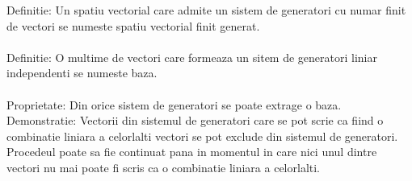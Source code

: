 \documentclass{article}
\begin{document}
        Definitie: Un spatiu vectorial care admite un sistem de generatori cu numar finit de vectori se numeste spatiu vectorial finit generat. \\ \\
        Definitie: O multime de vectori care formeaza un sitem de generatori liniar independenti se numeste baza. \\ \\
        Proprietate: Din orice sistem de generatori se poate extrage o baza.\\
        Demonstratie: Vectorii din sistemul de generatori care se pot scrie ca fiind o combinatie liniara a celorlalti vectori se pot exclude din sistemul de generatori. Procedeul poate sa fie continuat pana in momentul in care nici unul dintre vectori nu mai poate fi scris ca o combinatie liniara a celorlalti.
\end{document}
